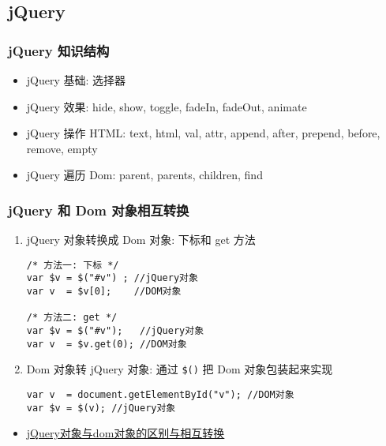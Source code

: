 \subsection{jQuery}\label{jquery}

\subsubsection{jQuery 知识结构}\label{jquery-ux77e5ux8bc6ux7ed3ux6784}

\begin{itemize}
\tightlist
\item
  jQuery 基础: 选择器
\item
  jQuery 效果: hide, show, toggle, fadeIn, fadeOut, animate
\item
  jQuery 操作 HTML: text, html, val, attr, append, after, prepend,
  before, remove, empty
\item
  jQuery 遍历 Dom: parent, parents, children, find
\end{itemize}

\subsubsection{jQuery 和 Dom
对象相互转换}\label{jquery-ux548c-dom-ux5bf9ux8c61ux76f8ux4e92ux8f6cux6362}

\begin{enumerate}
\def\labelenumi{\arabic{enumi}.}
\item
  jQuery 对象转换成 Dom 对象: 下标和 get 方法

\begin{lstlisting}
/* 方法一: 下标 */
var $v = $("#v") ; //jQuery对象
var v  = $v[0];    //DOM对象

/* 方法二: get */
var $v = $("#v");   //jQuery对象
var v  = $v.get(0); //DOM对象
\end{lstlisting}
\item
  Dom 对象转 jQuery 对象: 通过 \lstinline!$()! 把 Dom 对象包装起来实现

\begin{lstlisting}
var v  = document.getElementById("v"); //DOM对象
var $v = $(v); //jQuery对象
\end{lstlisting}
\end{enumerate}

\begin{itemize}
\tightlist
\item
  \href{http://segmentfault.com/a/1190000003710344}{jQuery对象与dom对象的区别与相互转换}
\end{itemize}


